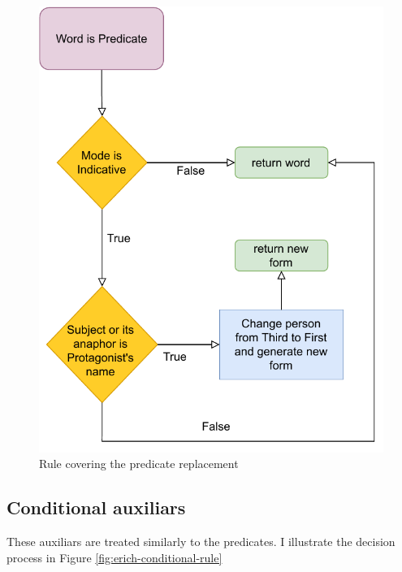 \begin{figure}[!htbp]
\includegraphics[]{data/Erich-Predicate-Rule.pdf}
\caption{Rule covering the predicate replacement}
\label{fig:erich-predicate-rule}
\end{figure}

\subsection{Conditional auxiliars}

These auxiliars are treated similarly to the predicates. I illustrate the decision process in Figure \ref{fig:erich-conditional-rule}


